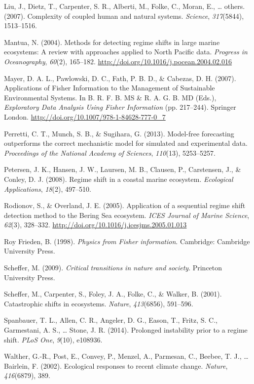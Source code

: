 \documentclass[12pt,twoside]{reedthesis}
\begin{document}
\leavevmode\hypertarget{ref-liu_complexity_2007}{}%
Liu, J., Dietz, T., Carpenter, S. R., Alberti, M., Folke, C., Moran, E., \ldots{} others. (2007). Complexity of coupled human and natural systems. \emph{Science}, \emph{317}(5844), 1513--1516.

\leavevmode\hypertarget{ref-mantua_methods_2004}{}%
Mantua, N. (2004). Methods for detecting regime shifts in large marine ecosystems: A review with approaches applied to North Pacific data. \emph{Progress in Oceanography}, \emph{60}(2), 165--182. \url{http://doi.org/10.1016/j.pocean.2004.02.016}

\leavevmode\hypertarget{ref-mayer_applications_2007}{}%
Mayer, D. A. L., Pawlowski, D. C., Fath, P. B. D., \& Cabezas, D. H. (2007). Applications of Fisher Information to the Management of Sustainable Environmental Systems. In B. R. F. B. MS \& R. A. G. B. MD (Eds.), \emph{Exploratory Data Analysis Using Fisher Information} (pp. 217--244). Springer London. \url{http://doi.org/10.1007/978-1-84628-777-0_7}

\leavevmode\hypertarget{ref-perretti_model-free_2013}{}%
Perretti, C. T., Munch, S. B., \& Sugihara, G. (2013). Model-free forecasting outperforms the correct mechanistic model for simulated and experimental data. \emph{Proceedings of the National Academy of Sciences}, \emph{110}(13), 5253--5257.

\leavevmode\hypertarget{ref-petersen2008regime}{}%
Petersen, J. K., Hansen, J. W., Laursen, M. B., Clausen, P., Carstensen, J., \& Conley, D. J. (2008). Regime shift in a coastal marine ecosystem. \emph{Ecological Applications}, \emph{18}(2), 497--510.

\leavevmode\hypertarget{ref-rodionov_application_2005}{}%
Rodionov, S., \& Overland, J. E. (2005). Application of a sequential regime shift detection method to the Bering Sea ecosystem. \emph{ICES Journal of Marine Science}, \emph{62}(3), 328--332. \url{http://doi.org/10.1016/j.icesjms.2005.01.013}

\leavevmode\hypertarget{ref-roy_frieden_physics_1998}{}%
Roy Frieden, B. (1998). \emph{Physics from Fisher information}. Cambridge: Cambridge University Press.

\leavevmode\hypertarget{ref-scheffer_critical_2009}{}%
Scheffer, M. (2009). \emph{Critical transitions in nature and society}. Princeton University Press.

\leavevmode\hypertarget{ref-scheffer_catastrophic_2001}{}%
Scheffer, M., Carpenter, S., Foley, J. A., Folke, C., \& Walker, B. (2001). Catastrophic shifts in ecosystems. \emph{Nature}, \emph{413}(6856), 591--596.

\leavevmode\hypertarget{ref-spanbauer_prolonged_2014}{}%
Spanbauer, T. L., Allen, C. R., Angeler, D. G., Eason, T., Fritz, S. C., Garmestani, A. S., \ldots{} Stone, J. R. (2014). Prolonged instability prior to a regime shift. \emph{PLoS One}, \emph{9}(10), e108936.

\leavevmode\hypertarget{ref-walther_ecological_2002}{}%
Walther, G.-R., Post, E., Convey, P., Menzel, A., Parmesan, C., Beebee, T. J., \ldots{} Bairlein, F. (2002). Ecological responses to recent climate change. \emph{Nature}, \emph{416}(6879), 389.


\end{document}
